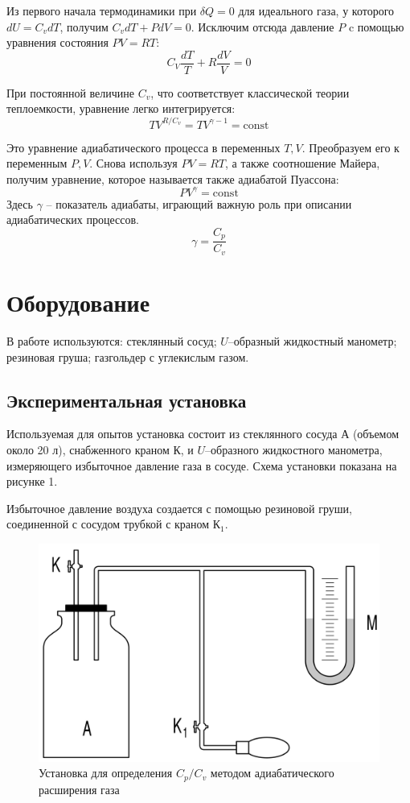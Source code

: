 \documentclass[a4paper,12pt]{article}
\theoremstyle{plain} %
\theoremstyle{definition} %
\theoremstyle{remark} %
\begin{document}
	Из первого начала термодинамики при $\delta Q = 0$ для идеального газа, у которого $dU = C_v dT$, получим $C_v dT + P dV = 0$. Исключим отсюда давление $P$ c помощью уравнения состояния $PV = RT$:
	\[C_V\frac{dT}{T}+R\frac{dV}{V} = 0 \]
	
	При постоянной величине $C_v$, что соответствует классической теории теплоемкости, уравнение легко интегрируется:
	\[TV^{R/C_v} = TV^{\gamma - 1} = \text{const} \]
	
	Это уравнение адиабатического процесса в переменных $T, V$. Преобразуем его к переменным $P, V$. Снова используя $PV = RT$, а также соотношение Майера, получим уравнение, которое называется также адиабатой Пуассона:
	\begin{equation}
	PV^{\gamma} = \text{const}
	\end{equation}
	Здесь $\gamma$ -- показатель адиабаты, играющий важную роль при описании адиабатических процессов.
	\begin{equation}
	\gamma = \frac{C_p}{C_v}
	\end{equation}
	\section{Оборудование}
	В работе используются: стеклянный сосуд; $U$--образный жидкостный манометр; резиновая груша; газгольдер с углекислым газом.
	\subsection{Экспериментальная установка}
	Используемая для опытов установка состоит из стеклянного сосуда $\text{А}$ (объемом около 20 л), снабженного краном $\text{К}$, и $U$--образного жидкостного манометра, измеряющего избыточное давление газа в сосуде. Схема установки показана на рисунке 1.
	
	Избыточное давление воздуха создается с помощью резиновой груши, соединенной с сосудом трубкой с краном $\text{К}_1$. 
	\begin{figure}[H]
		\begin{center}
			\includegraphics[width=0.7\linewidth]{1}
			\caption{Установка для определения $C_p/C_v$ методом адиабатического расширения газа}
		\end{center}
	\end{figure}
\end{document}
